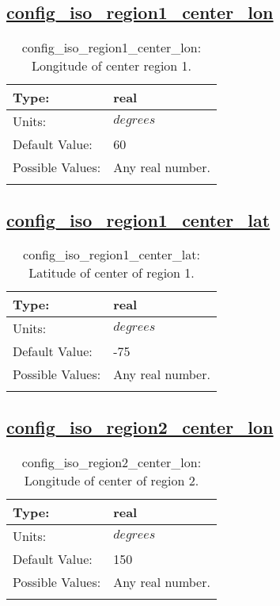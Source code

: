 \subsection[config\_iso\_region1\_center\_lon]{\hyperref[sec:nm_tab_iso]{config\_iso\_region1\_center\_lon}}
\label{subsec:nm_sec_config_iso_region1_center_lon}
\begin{center}
\begin{longtable}{| p{2.0in} || p{4.0in} |}
    \hline
    Type: & real \\
    \hline
    Units: & $degrees$ \\
    \hline
    Default Value: & 60 \\
    \hline
    Possible Values: & Any real number. \\
    \hline
    \caption{config\_iso\_region1\_center\_lon: Longitude of center region 1.}
\end{longtable}
\end{center}
\subsection[config\_iso\_region1\_center\_lat]{\hyperref[sec:nm_tab_iso]{config\_iso\_region1\_center\_lat}}
\label{subsec:nm_sec_config_iso_region1_center_lat}
\begin{center}
\begin{longtable}{| p{2.0in} || p{4.0in} |}
    \hline
    Type: & real \\
    \hline
    Units: & $degrees$ \\
    \hline
    Default Value: & -75 \\
    \hline
    Possible Values: & Any real number. \\
    \hline
    \caption{config\_iso\_region1\_center\_lat: Latitude of center of region 1.}
\end{longtable}
\end{center}
\subsection[config\_iso\_region2\_center\_lon]{\hyperref[sec:nm_tab_iso]{config\_iso\_region2\_center\_lon}}
\label{subsec:nm_sec_config_iso_region2_center_lon}
\begin{center}
\begin{longtable}{| p{2.0in} || p{4.0in} |}
    \hline
    Type: & real \\
    \hline
    Units: & $degrees$ \\
    \hline
    Default Value: & 150 \\
    \hline
    Possible Values: & Any real number. \\
    \hline
    \caption{config\_iso\_region2\_center\_lon: Longitude of center of region 2.}
\end{longtable}
\end{center}
